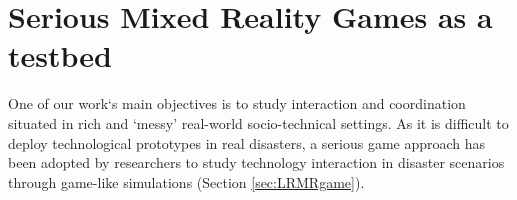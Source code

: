




\section{Serious Mixed Reality Games as a testbed} \label{sec:SMRG}
One of our work`s main objectives is to study interaction and coordination situated in rich and `messy' real-world socio-technical settings. As it is difficult to deploy technological prototypes in real disasters, a serious game approach has been adopted by researchers to study technology interaction in disaster scenarios through game-like simulations (Section \ref{sec:LRMRgame}).

